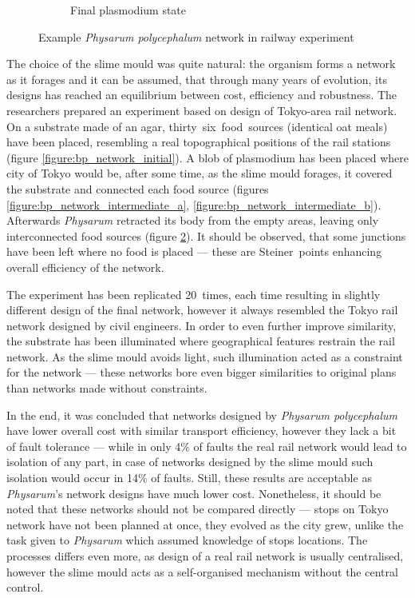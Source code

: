 \documentclass[english,a4paper,twoside]{ppfcmthesis}
\begin{document}
\begin{figure}
\begin{subfigure}{0.33\textwidth}
    \caption{Final plasmodium state}
    \label{figure:bp_network_final}
  \end{subfigure}
  \caption{Example \textit{Physarum polycephalum} network in railway experiment \cite{tero2010rules}}
\end{figure}

The choice of the slime mould was quite natural: the organism forms a network as it forages and it can be assumed, that through many years of evolution, its designs has reached an equilibrium between cost, efficiency and robustness. The researchers prepared an experiment based on design of Tokyo-area rail network. On a substrate made of an agar, thirty~six~food~sources (identical oat meals) have been placed, resembling a real topographical positions of the rail stations (figure \ref{figure:bp_network_initial}). A blob of plasmodium has been placed where city of Tokyo would be, after some time, as the slime mould forages, it covered the substrate and connected each food source (figures \ref{figure:bp_network_intermediate_a}, \ref{figure:bp_network_intermediate_b}). Afterwards \textit{Physarum} retracted its body from the empty areas, leaving only interconnected food sources (figure \ref{figure:bp_network_final}). It should be observed, that some junctions have been left where no food is placed --- these are Steiner~points \cite{kou1981fast} enhancing overall efficiency of the network.

The experiment has been replicated 20~times, each time resulting in slightly different design of the final network, however it always resembled the Tokyo rail network designed by civil engineers. In order to even further improve similarity, the substrate has been illuminated where geographical features restrain the rail network. As the slime mould avoids light, such illumination acted as a constraint for the network --- these networks bore even bigger similarities to original plans than networks made without constraints. 

In the end, it was concluded that networks designed by \textit{Physarum polycephalum} have lower overall cost with similar transport efficiency, however they lack a bit of fault tolerance --- while in only 4\% of faults the real rail network would lead to isolation of any part, in case of networks designed by the slime mould such isolation would occur in 14\% of faults. Still, these results are acceptable as \textit{Physarum}'s network designs have much lower cost. Nonetheless, it should be noted that these networks should not be compared directly --- stops on Tokyo network have not been planned at once, they evolved as the city grew, unlike the task given to \textit{Physarum} which assumed knowledge of stops locations. The processes differs even more, as design of a real rail network is usually centralised, however the slime mould acts as a self-organised mechanism without the central control.
\end{document}
